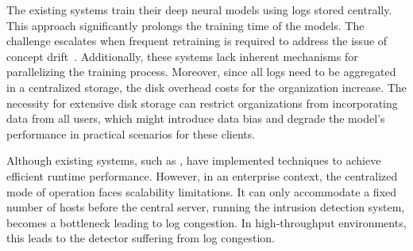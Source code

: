 The existing systems train their deep neural models using logs stored centrally. This approach significantly prolongs the training time of the models. The challenge escalates when frequent retraining is required to address the issue of concept drift~\cite{lu2018learning}. Additionally, these systems lack inherent mechanisms for parallelizing the training process. Moreover, since all logs need to be aggregated in a centralized storage, the disk overhead costs for the organization increase. The necessity for extensive disk storage can restrict organizations from incorporating data from all users, which might introduce data bias and degrade the model's performance in practical scenarios for these clients.

Although existing systems, such as \flash, have implemented techniques to achieve efficient runtime performance. However, in an enterprise context, the centralized mode of operation faces scalability limitations. It can only accommodate a fixed number of hosts before the central server, running the intrusion detection system, becomes a bottleneck leading to log congestion. In high-throughput environments, this leads to the detector suffering from log congestion.


